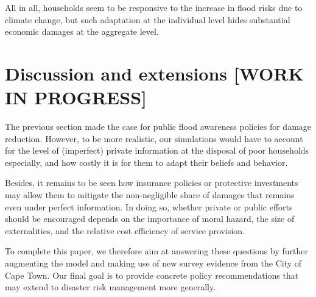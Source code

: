 \documentclass[12pt]{article}
\begin{document}
All in all, households seem to be responsive to the increase in flood risks due to climate change, but such adaptation at the individual level hides substantial economic damages at the aggregate level.


\section{Discussion and extensions [WORK IN PROGRESS]}
\label{sec-discuss}

The previous section made the case for public flood awareness policies for damage reduction. However, to be more realistic, our simulations would have to account for the level of (imperfect) private information at the disposal of poor households especially, and how costly it is for them to adapt their beliefs and behavior. 

Besides, it remains to be seen how insurance policies or protective investments may allow them to mitigate the non-negligible share of damages that remains even under perfect information. In doing so, whether private or public efforts should be encouraged depends on the importance of moral hazard, the size of externalities, and the relative cost efficiency of service provision.

To complete this paper, we therefore aim at answering these questions by further augmenting the model and making use of new survey evidence from the City of Cape Town. Our final goal is to provide concrete policy recommendations that may extend to disaster risk management more generally.

\end{document}
